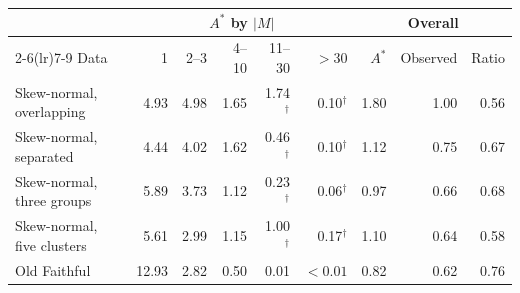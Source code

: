 \begin{tabular}{l rrrrr rrr}
\toprule
 & \multicolumn{5}{c}{$A^*$ by $|M|$} & \multicolumn{3}{c}{Overall} \\
\cmidrule(lr){2-6}\cmidrule(lr){7-9}
Data & 1 & 2--3 & 4--10 & 11--30 & $>30$ & $A^*$ & Observed & Ratio \\
\midrule
Skew-normal, overlapping & 4.93 & 4.98 & 1.65 & 1.74$^\dagger$ & 0.10$^\dagger$ & 1.80 & 1.00 & 0.56 \\
Skew-normal, separated & 4.44 & 4.02 & 1.62 & 0.46$^\dagger$ & 0.10$^\dagger$ & 1.12 & 0.75 & 0.67 \\
Skew-normal, three groups & 5.89 & 3.73 & 1.12 & 0.23$^\dagger$ & 0.06$^\dagger$ & 0.97 & 0.66 & 0.68 \\
Skew-normal, five clusters & 5.61 & 2.99 & 1.15 & 1.00$^\dagger$ & 0.17$^\dagger$ & 1.10 & 0.64 & 0.58 \\
Old Faithful & 12.93 & 2.82 & 0.50 & 0.01 & $<0.01$ & 0.82 & 0.62 & 0.76 \\
\bottomrule
\end{tabular}
